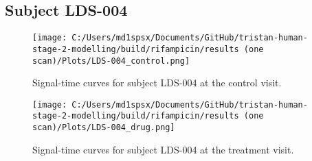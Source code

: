 \documentclass{epflreport}%
\begin{document}
\subsection{Subject LDS{-}004}%
\label{subsec:SubjectLDS{-}004}%

%


\begin{figure}[h!]%
\centering%
\texttt{[image: C:/Users/md1spsx/Documents/GitHub/tristan-human-stage-2-modelling/build/rifampicin/results (one scan)/Plots/LDS-004\_control.png]}%
\caption{Signal{-}time curves for subject LDS{-}004 at the control visit.}%
\end{figure}

%


\begin{figure}[h!]%
\centering%
\texttt{[image: C:/Users/md1spsx/Documents/GitHub/tristan-human-stage-2-modelling/build/rifampicin/results (one scan)/Plots/LDS-004\_drug.png]}%
\caption{Signal{-}time curves for subject LDS{-}004 at the treatment visit.}%
\end{figure}
\end{document}
